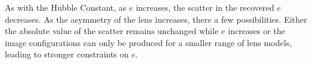 As with the Hubble Constant, as $e$ increases, the scatter in the recovered $e$ decreases. As the asymmetry of the lens increases, there a few possibilities. Either the absolute value of the scatter remains unchanged while $e$ increases or the image configurations can only be produced for a smaller range of lens models, leading to stronger constraints on $e$.